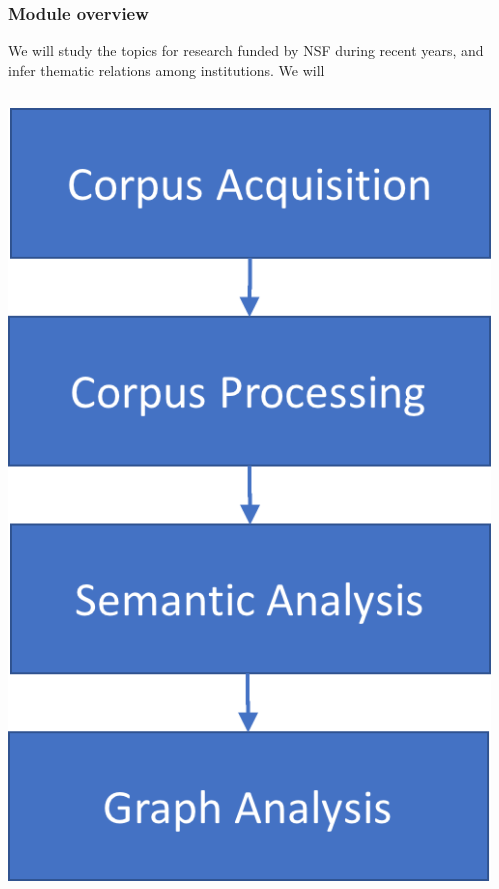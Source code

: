 \documentclass{beamer}
\begin{document}
\begin{frame}

	\frametitle{Module overview}

			We will study the topics for research funded by NSF during recent
			years, and infer thematic relations among institutions. We will


	\begin{columns}
	
	\begin{column}{.3\textwidth}
		\vspace{.2cm}
		\centerline{\includegraphics[width=.9\textwidth]{./figs/NLPTM_schema.png}}
	\end{column}
	
	\begin{column}{.6\textwidth}
		\begin{itemize}
			

\end{itemize}
\end{column}
\end{columns}
\end{frame}
\end{document}
